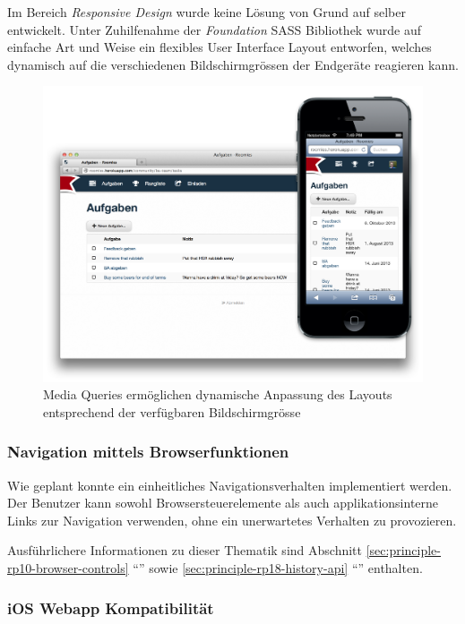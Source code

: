 Im Bereich \emph{Responsive Design} wurde keine Lösung von Grund auf selber entwickelt. Unter Zuhilfenahme der \emph{Foundation} SASS Bibliothek \cite{Foundation} wurde auf einfache Art und Weise ein flexibles User Interface Layout entworfen, welches dynamisch auf die verschiedenen Bildschirmgrössen der Endgeräte reagieren kann.

\begin{figure}[H]
	\centering
	\includegraphics[width=12cm]{content/principle-demonstration/images/responsive-screenshots.png}
	\caption{Media Queries ermöglichen dynamische Anpassung des Layouts entsprechend der verfügbaren Bildschirmgrösse}
	\label{fig:responsive-screenshots}
\end{figure}


\subsubsection*{Navigation mittels Browserfunktionen}

Wie geplant konnte ein einheitliches Navigationsverhalten implementiert werden. Der Benutzer kann sowohl Browsersteuerelemente als auch applikationsinterne Links zur Navigation verwenden, ohne ein unerwartetes Verhalten zu provozieren.

Ausführlichere Informationen zu dieser Thematik sind Abschnitt \ref{sec:principle-rp10-browser-controls} ``'' sowie \ref{sec:principle-rp18-history-api} ``'' enthalten.


\subsubsection*{iOS Webapp Kompatibilität}

